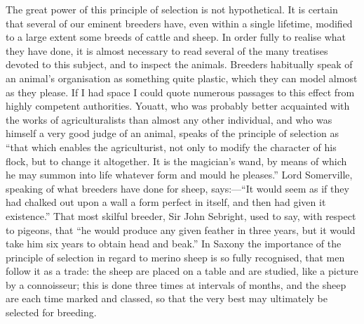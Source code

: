 \documentclass{book}
\begin{document}
The great power of this principle of selection is not hypothetical. It is
certain that several of our eminent breeders have, even within a single
lifetime, modified to
a large extent some breeds of cattle and sheep. In order fully to realise what
they have done, it is almost necessary to read several of the many treatises
devoted to this subject, and to inspect the animals. Breeders habitually speak
of an animal's organisation as something quite plastic, which they can
model almost as they please. If I had space I could quote numerous passages to
this effect from highly competent authorities. Youatt, who was probably better
acquainted with the works of agriculturalists than almost any other individual,
and who was himself a very good judge of an animal, speaks of the principle of
selection as ``that which enables the agriculturist, not only to modify
the character of his flock, but to change it altogether. It is the
magician's wand, by means of which he may summon into life whatever form
and mould he pleases.'' Lord Somerville, speaking of what breeders have
done for sheep, says:---``It would seem as if they had chalked out
upon a wall a form perfect in itself, and then had given it existence.''
That most skilful breeder, Sir John Sebright, used to say, with respect to
pigeons, that ``he would produce any given feather in three years, but it
would take him six years to obtain head and beak.'' In Saxony the
importance of the principle of selection in regard to merino sheep is so fully
recognised, that men follow it as a trade: the sheep are placed on a table and
are studied, like a picture by a connoisseur; this is done three times at
intervals of months, and the sheep are each time marked and classed, so that
the very best may ultimately be selected for breeding.
\end{document}
